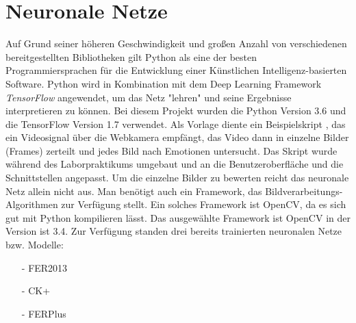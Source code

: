 \documentclass[10pt,a4paper]{report}
\begin{document}
\section{Neuronale Netze}
\label{subsec:statistical-summaries}
Auf Grund seiner höheren Geschwindigkeit und großen Anzahl von verschiedenen
bereitgestellten Bibliotheken gilt Python als eine der besten Programmiersprachen
für die Entwicklung einer Künstlichen Intelligenz-basierten Software.
\newline
Python wird in Kombination mit dem Deep Learning Framework  \textit{TensorFlow} angewendet, um das Netz "lehren" und seine Ergebnisse interpretieren zu können.
Bei diesem Projekt wurden die Python Version 3.6 und die TensorFlow Version
1.7 verwendet.
 \newline
Als Vorlage diente ein Beispielskript \cite{LeweOhlsenGit}, das ein Videosignal über die Webkamera
empfängt, das Video dann in einzelne Bilder (Frames) zerteilt und jedes Bild
nach Emotionen untersucht. Das Skript wurde während des Laborpraktikums
umgebaut und an die Benutzeroberfläche und die Schnittstellen angepasst.\newline
Um die einzelne Bilder zu bewerten reicht das neuronale Netz allein nicht aus. Man
benötigt auch ein Framework, das Bildverarbeitungs-Algorithmen zur Verfügung
stellt. Ein solches Framework ist OpenCV, da es sich gut mit Python kompilieren lässt.
Das ausgewählte Framework ist OpenCV in der Version ist 3.4.
 \newline
Zur Verfügung standen drei bereits trainierten neuronalen Netze bzw. Modelle: \newline
\begin{itemize}
\item[-]  FER2013 \cite{IasGoodefellow}
\item[-] CK+
\item[-] FERPlus \newline
\end{itemize}
 
\end{document}
